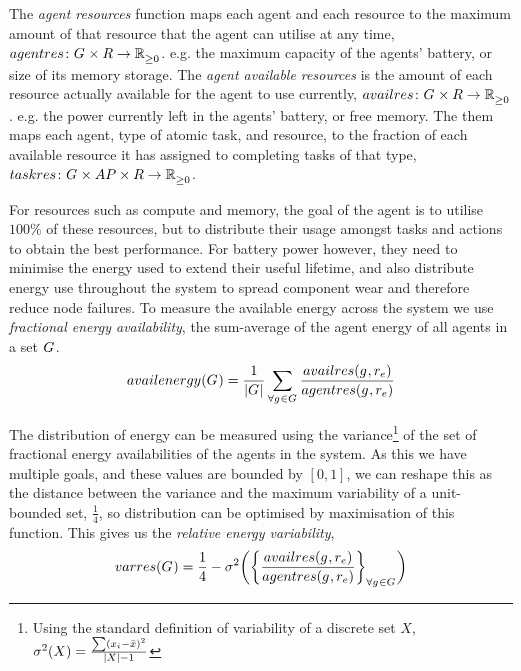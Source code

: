 \newcommand{\functionEnergyVariability}[2]{
	\ifx \\#1\\
	\functionSignature{\functionEnergyVariabilitySymbol{}{}}
	{\setAgents{}{}}
	\else
	\functionSignature{\functionEnergyVariabilitySymbol{}{}}{#1}
	\fi
}
The \textit{agent resources} function maps each agent and each resource to the maximum amount of that resource that the agent can utilise at any time, $\formalAgentResources{}{}$. e.g. the maximum capacity of the agents' battery, or size of its memory storage. 
The \textit{agent available resources} is the amount of each resource actually available for the agent to use currently, $\formalAgentAvailableResources{}{}$. e.g. the power currently left in the agents' battery, or free memory. The  them maps each agent, type of atomic task, and resource, to the fraction of each available resource it has assigned to completing tasks of that type, $\formalTaskResourceAllocation{}{}$.

For resources such as compute and memory, the goal of the agent is to utilise $100\%$ of these resources, but to distribute their usage amongst tasks and actions to obtain the best performance. For battery power however, they need to minimise the energy used to extend their useful lifetime, and also distribute energy use throughout the system to spread component wear and therefore reduce node failures. To measure the available energy across the system we use \textit{fractional energy availability}, the sum-average of the agent energy of all agents in a set $G_{}^{}$.
\begin{equation}
	\functionEnergyAvailable{}{} 
	= \frac{1}{\funcSize{\setAgents{}{}}}
		\sum_{\forall \varAgent{}{} \in \setAgents{}{}} 
		\frac
		{\functionAgentAvailableResourcesEnergy{}{}}
		{\functionAgentResourcesEnergy{}{}}
\end{equation}

The distribution of energy can be measured using the variance\footnote{Using the standard definition of variability of a discrete set $X$, $\sigma^2(X) = \frac{\sum (x_i - \bar{x})^2}{\lvert X \rvert-1}$} of the set of fractional energy availabilities of the agents in the system. As this we have multiple goals, and these values are bounded by $[0, 1]$, we can reshape this as the distance between the variance and the maximum variability of a unit-bounded set, $\frac{1}{4}$, so distribution can be optimised by maximisation of this function. This gives us the \textit{relative energy variability},
\begin{equation}     	
	\functionEnergyVariability{}{} 
	= \frac{1}{4} - \sigma^2 
	\bigg(
	\bigg\lbrace \frac
		{\functionAgentAvailableResourcesEnergy{}{}}
		{\functionAgentResourcesEnergy{}{}}
	\bigg\rbrace_{\forall \varAgent{}{} \in \setAgents{}{}}
	\bigg)
\end{equation}

